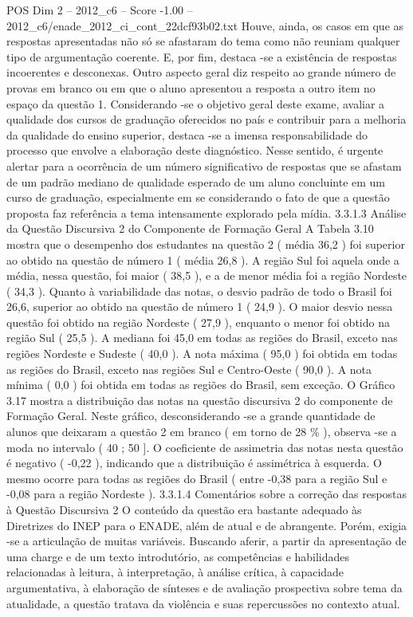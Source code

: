 \begin{textsample}{POS Dim 2 – 2012\_c6 – Score -1.00 – 2012\_c6/enade\_2012\_ci\_cont\_22dcf93b02.txt}
Houve, ainda, os casos em que as respostas apresentadas não só se afastaram do tema como não reuniam qualquer tipo de argumentação coerente.
E, por fim, destaca -se a existência de respostas incoerentes e desconexas.
Outro aspecto geral diz respeito ao grande número de provas em branco ou em que o aluno apresentou a resposta a outro item no espaço da questão 1.
Considerando -se o objetivo geral deste exame, avaliar a qualidade dos cursos de graduação oferecidos no país e contribuir para a melhoria da qualidade do ensino superior, destaca -se a imensa responsabilidade do processo que envolve a elaboração deste diagnóstico.
Nesse sentido, é urgente alertar para a ocorrência de um número significativo de respostas que se afastam de um padrão mediano de qualidade esperado de um aluno concluinte em um curso de graduação, especialmente em se considerando o fato de que a questão proposta faz referência a tema intensamente explorado pela mídia. 3.3.1.3 Análise da Questão Discursiva 2 do Componente de Formação Geral A Tabela 3.10 mostra que o desempenho dos estudantes na questão 2 ( média 36,2 ) foi superior ao obtido na questão de número 1 ( média 26,8 ).
A região Sul foi aquela onde a média, nessa questão, foi maior ( 38,5 ), e a de menor média foi a região Nordeste ( 34,3 ).
Quanto à variabilidade das notas, o desvio padrão de todo o Brasil foi 26,6, superior ao obtido na questão de número 1 ( 24,9 ).
O maior desvio nessa questão foi obtido na região Nordeste ( 27,9 ), enquanto o menor foi obtido na região Sul ( 25,5 ).
A mediana foi 45,0 em todas as regiões do Brasil, exceto nas regiões Nordeste e Sudeste ( 40,0 ).
A nota máxima ( 95,0 ) foi obtida em todas as regiões do Brasil, exceto nas regiões Sul e Centro-Oeste ( 90,0 ).
A nota mínima ( 0,0 ) foi obtida em todas as regiões do Brasil, sem exceção.
O Gráfico 3.17 mostra a distribuição das notas na questão discursiva 2 do componente de Formação Geral.
Neste gráfico, desconsiderando -se a grande quantidade de alunos que deixaram a questão 2 em branco ( em torno de 28 \% ), observa -se a moda no intervalo ( 40 ; 50 ].
O coeficiente de assimetria das notas nesta questão é negativo ( -0,22 ), indicando que a distribuição é assimétrica à esquerda.
O mesmo ocorre para todas as regiões do Brasil ( entre -0,38 para a região Sul e -0,08 para a região Nordeste ). 3.3.1.4 Comentários sobre a correção das respostas à Questão Discursiva 2 O conteúdo da questão era bastante adequado às Diretrizes do INEP para o ENADE, além de atual e de abrangente.
Porém, exigia -se a articulação de muitas variáveis.
Buscando aferir, a partir da apresentação de uma charge e de um texto introdutório, as competências e habilidades relacionadas à leitura, à interpretação, à análise crítica, à capacidade argumentativa, à elaboração de sínteses e de avaliação prospectiva sobre tema da atualidade, a questão tratava da violência e suas repercussões no contexto atual.

\end{textsample}
